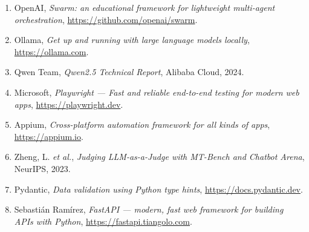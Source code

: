 \documentclass[12pt,a4paper,oneside]{report}
\begin{document}
\begin{enumerate}[leftmargin=*]
  \item OpenAI, \textit{Swarm: an educational framework for lightweight multi-agent
  orchestration}, \url{https://github.com/openai/swarm}.
  \item Ollama, \textit{Get up and running with large language models locally},
  \url{https://ollama.com}.
  \item Qwen Team, \textit{Qwen2.5 Technical Report}, Alibaba Cloud, 2024.
  \item Microsoft, \textit{Playwright — Fast and reliable end-to-end testing for
  modern web apps}, \url{https://playwright.dev}.
  \item Appium, \textit{Cross-platform automation framework for all kinds of apps},
  \url{https://appium.io}.
  \item Zheng, L. \textit{et al.}, \textit{Judging LLM-as-a-Judge with MT-Bench and
  Chatbot Arena}, NeurIPS, 2023.
  \item Pydantic, \textit{Data validation using Python type hints},
  \url{https://docs.pydantic.dev}.
  \item Sebastián Ramírez, \textit{FastAPI — modern, fast web framework for building
  APIs with Python}, \url{https://fastapi.tiangolo.com}.
\end{enumerate}
\end{document}

